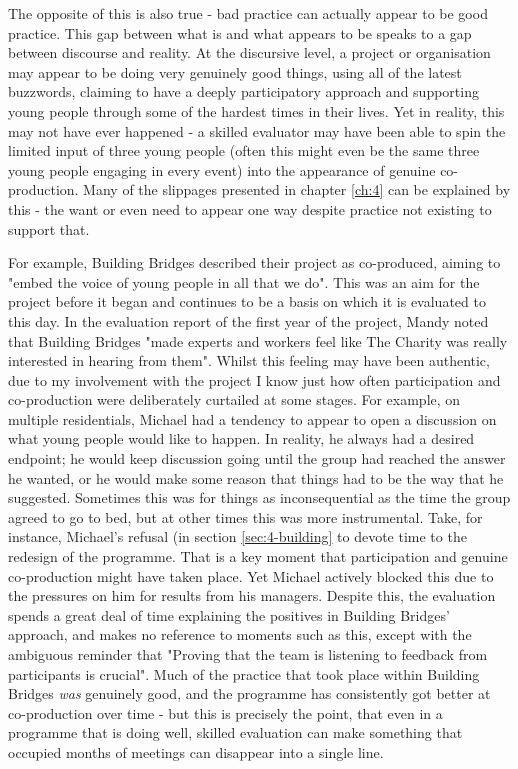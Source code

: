 The opposite of this is also true - bad practice can actually appear to be good practice. This gap between what is and what appears to be speaks to a gap between discourse and reality. At the discursive level, a project or organisation may appear to be doing very genuinely good things, using all of the latest buzzwords, claiming to have a deeply participatory approach and supporting young people through some of the hardest times in their lives. Yet in reality, this may not have ever happened - a skilled evaluator may have been able to spin the limited input of three young people (often this might even be the same three young people engaging in every event) into the appearance of genuine co-production. Many of the slippages presented in chapter \ref{ch:4} can be explained by this - the want or even need to appear one way despite  practice not existing to support that.

For example, Building Bridges described their project as co-produced, aiming to "embed the voice of young people in all that we do". This was an aim for the project before it began and continues to be a basis on which it is evaluated to this day. In the evaluation report of the first year of the project, Mandy noted that Building Bridges "made experts and workers feel like The Charity was really interested in hearing from them". Whilst this feeling may have been authentic, due to my involvement with the project I know just how often participation and co-production were deliberately curtailed at some stages. For example, on multiple residentials, Michael had a tendency to appear to open a discussion on what young people would like to happen. In reality, he always had a desired endpoint; he would keep discussion going until the group had reached the answer he wanted, or  he would make some reason that things had to be the way that he suggested. Sometimes this was for things as inconsequential as the time the group agreed to go to bed, but at other times this was more instrumental. Take, for instance, Michael's refusal (in section \ref{sec:4-building} to devote time to the redesign of the programme. That is a key moment that participation and genuine co-production might have taken place. Yet Michael actively blocked this due to the pressures on him for results from his managers. Despite this, the evaluation spends a great deal of time explaining the positives in Building Bridges' approach, and makes no reference to moments such as this, except with the ambiguous reminder that "Proving that the team is listening to feedback from participants is crucial". Much of the practice that took place within Building Bridges \emph{was} genuinely good, and the programme has consistently got better at co-production over time - but this is precisely the point, that even in a programme that is doing well, skilled evaluation can make something that occupied months of meetings can disappear into a single line.

